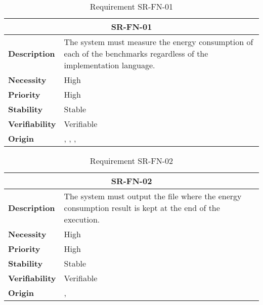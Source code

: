 \begin{table}[H]
    \centering
    \begin{tabular}{l p{10cm}}
        \toprule
        \multicolumn{2}{c}{SR-FN-01} \\
        \toprule
        \textbf{Description}        &  The system must measure the energy consumption of each of the benchmarks regardless of the implementation language. \\
        \textbf{Necessity}          &  High \\
        \textbf{Priority}           &  High \\
        \textbf{Stability}          &  Stable \\
        \textbf{Verifiability}      & Verifiable \\
        \textbf{Origin}             & \textit{\nameref{tab:ur-ca-05}}, \textit{\nameref{tab:ur-ca-09}}, \textit{\nameref{tab:ur-ca-16}}, \textit{\nameref{tab:ur-ca-17}} \\
    \end{tabular}
    \caption{Requirement SR-FN-01}
    \label{tab:sr-fn-01}
\end{table}

\begin{table}[H]
    \centering
    \begin{tabular}{l p{10cm}}
        \toprule
        \multicolumn{2}{c}{SR-FN-02} \\
        \toprule
        \textbf{Description}        &  The system must output the file where the energy consumption result is kept at the end of the execution. \\
        \textbf{Necessity}          &  High \\
        \textbf{Priority}           &  High \\
        \textbf{Stability}          &  Stable \\
        \textbf{Verifiability}      & Verifiable \\
        \textbf{Origin}             & \textit{\nameref{tab:ur-ca-09}}, \textit{\nameref{tab:ur-ca-14}} \\
    \end{tabular}
    \caption{Requirement SR-FN-02}
    \label{tab:sr-fn-02}
\end{table}


